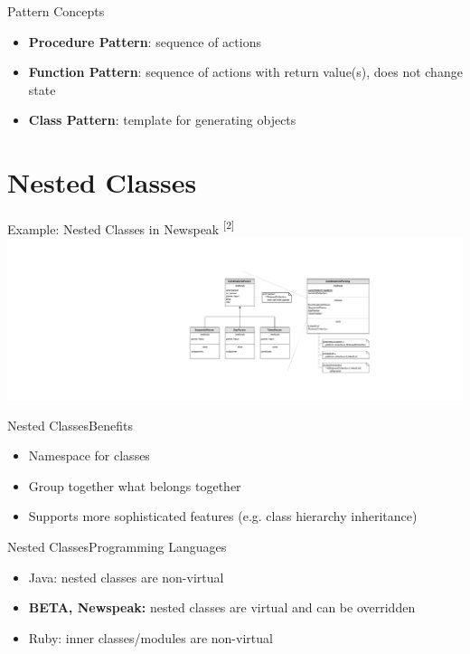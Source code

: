 \documentclass[xcolor=dvipsname,handout]{beamer} %
\begin{document}
\begin{frame}{Pattern Concepts}
  \begin{itemize}
    \item \textbf{Procedure Pattern}: sequence of actions
    \item \textbf{Function Pattern}: sequence of actions with return value(s), does not change state
    \item \textbf{Class Pattern}: template for generating objects
  \end{itemize}
\end{frame}

\section{Nested Classes}
\begin{frame}{Example: Nested Classes in Newspeak \textsuperscript{[2]}}
\includegraphics[width=\textwidth]{newspeak_basic.pdf}
\end{frame}

\begin{frame}{Nested Classes}{Benefits}
\begin{itemize}
  \item Namespace for classes
  \item Group together what belongs together
  \item Supports more sophisticated features (e.g. class hierarchy inheritance)
\end{itemize}
\end{frame}

\begin{frame}{Nested Classes}{Programming Languages}
\begin{itemize}
  \item Java: nested classes are non-virtual
  \item \textbf{BETA, Newspeak:} nested classes are virtual and can be overridden
  \item Ruby: inner classes/modules are non-virtual
\end{itemize}
\end{frame}
\end{document}
